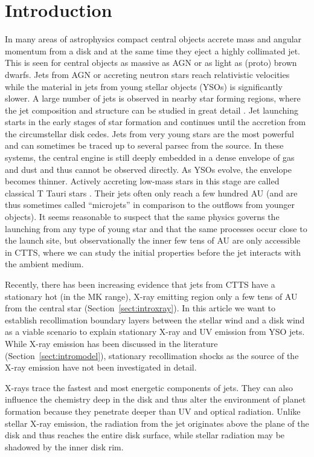 \section{Introduction} 
In many areas of astrophysics compact central objects accrete mass and angular momentum from a disk and at the same time they eject a highly collimated jet. This is seen for central objects as massive as AGN or as light as (proto) brown dwarfs. Jets from AGN or accreting neutron stars reach relativistic velocities while the material in jets from young stellar objects (YSOs) is significantly slower. 
A large number of jets is observed in nearby star forming regions, where the jet composition and structure can be studied in great detail \citep[see the review by][]{2014arXiv1402.3553F}.
Jet launching starts in the early stages of star formation and continues until the accretion from the circumstellar disk cedes. Jets from very young stars are the most powerful and can sometimes be traced up to several parsec from the source. In these systems, the central engine is still deeply embedded in a dense envelope of gas and dust and thus cannot be observed directly. As YSOs evolve, the envelope becomes thinner. Actively accreting low-mass stars in this stage are called classical T Tauri stars \citep[for a review see][]{2013AN....334...67G}. Their jets often only reach a few hundred AU (and are thus sometimes called ``microjets'' in comparison to the outflows from younger objects).
It seems reasonable to suspect that the same physics governs the launching from any type of young star and that the same processes occur close to the launch site, but observationally the inner few tens of AU are only accessible in CTTS, where we can study the initial properties before the jet interacts with the ambient medium. 

Recently, there has been increasing evidence that jets from CTTS have a stationary hot (in the MK range), X-ray emitting region only a few tens of AU from the central star (Section~\ref{sect:introxray}). In this article we want to establish recollimation boundary layers between the stellar wind and a disk wind as a viable scenario to explain stationary X-ray and UV emission from YSO jets.
While X-ray emission has been discussed in the literature (Section~\ref{sect:intromodel}), stationary recollimation shocks as the source of the X-ray emission have not been investigated in detail. 

X-rays trace the fastest and most energetic components of jets. They can also influence the chemistry deep in the disk \citep[e.g.][]{2010ApJ...714.1511H,2012ApJ...756..157G} and thus alter the environment of planet formation because they penetrate deeper than UV and optical radiation. Unlike stellar X-ray emission, the radiation from the jet originates above the plane of the disk and thus reaches the entire disk surface, while stellar radiation may be shadowed by the inner disk rim.

